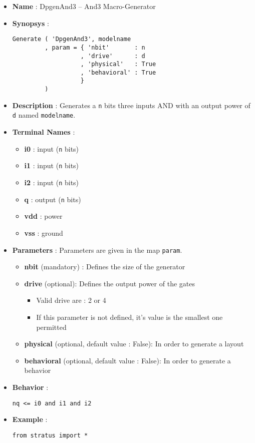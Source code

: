 \begin{itemize}
    \item \textbf{Name} : DpgenAnd3 -- And3 Macro-Generator
    \item \textbf{Synopsys} :
\begin{verbatim}
Generate ( 'DpgenAnd3', modelname
         , param = { 'nbit'       : n
                   , 'drive'      : d
                   , 'physical'   : True
                   , 'behavioral' : True
                   }
         )
\end{verbatim}
    \item \textbf{Description} : Generates a \verb-n- bits three inputs AND with an output power of \verb-d- named \verb-modelname-.
    \item \textbf{Terminal Names} :
    \begin{itemize}
        \item \textbf{i0} : input (\verb-n- bits)
        \item \textbf{i1} : input (\verb-n- bits)
        \item \textbf{i2} : input (\verb-n- bits)
        \item \textbf{q} : output (\verb-n- bits)
        \item \textbf{vdd} : power
        \item \textbf{vss} : ground
    \end{itemize}
    \item \textbf{Parameters} : Parameters are given in the map \verb-param-.
    \begin{itemize}
        \item \textbf{nbit} (mandatory) : Defines the size of the generator
        \item \textbf{drive} (optional): Defines the output power of the gates
        \begin{itemize}
            \item Valid drive are : 2 or 4
            \item If this parameter is not defined, it's value is the smallest one permitted
        \end{itemize}
        \item \textbf{physical} (optional, default value : False): In order to generate a layout
        \item \textbf{behavioral} (optional, default value : False): In order to generate a behavior
    \end{itemize}
    \item \textbf{Behavior} :
\begin{verbatim}
nq <= i0 and i1 and i2
\end{verbatim}
    \item \textbf{Example} :
\begin{verbatim}
from stratus import *


\end{verbatim}
\end{itemize}
